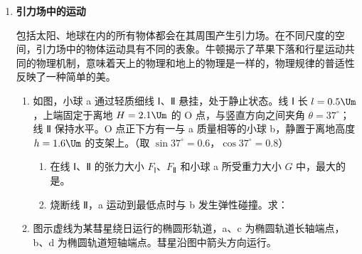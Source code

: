 \documentclass[\gkver]{gaokaozhenti}
\begin{document}
\begin{enumerate}
{（2）加偏振片只会影响激光的强度，并不会影响激光的波长，因此干涉条纹间距不变。正确选项为 B。

（3）与双缝干涉的规律类似，单缝衍射图样中央亮纹的宽度随缝宽的减小而增大、随单缝与传感器距离的增大而增大。正确选项为 AD。

2．由光子能量公式 $E = h\nu$ 和波长、频率、波速关系式 $\nu = \frac{c}{\lambda}$ 可得单个光子的能量为 $\frac{hc}{\lambda}$；由光电方程 $E_{\text{km}} = h\nu - W$ 和逸出功与截止频率关系式 $W = h\nu_{0}$ 可得逸出光电子的最大初动能 $E_{\text{km}} = \frac{hc}{\lambda} - h\nu_{0}$。
}

\item
\textbf{引力场中的运动}

包括太阳、地球在内的所有物体都会在其周围产生引力场。在不同尺度的空间，引力场中的物体运动具有不同的表象。牛顿揭示了苹果下落和行星运动共同的物理机制，意味着天上的物理和地上的物理是一样的，物理规律的普适性反映了一种简单的美。
\begin{enumerate}
	\item
	如图，小球 a 通过轻质细线 Ⅰ、Ⅱ 悬挂，处于静止状态。线 Ⅰ 长 $l = 0.5 \Um$，上端固定于离地 $H = 2.1 \Um$ 的 O 点，与竖直方向之间夹角 $\theta = 37^\circ$；线 Ⅱ 保持水平。O 点正下方有一与 a 质量相等的小球 b，静置于离地高度 $h = 1.6 \Um$ 的支架上。（取 $\sin37^\circ = 0.6$，$\cos37^\circ = 0.8$）

	\onepicture[h=3.2cm, align=right]{}
	\begin{enumerate}
		\item
		在线 Ⅰ、Ⅱ 的张力大小 $F_{\text{Ⅰ}}$、$F_{\text{Ⅱ}}$ 和小球 a 所受重力大小 $G$ 中，最大的是。

		\item
		烧断线 Ⅱ，a 运动到最低点时与 b 发生弹性碰撞。求：
	\end{enumerate}

	\item
	图示虚线为某彗星绕日运行的椭圆形轨道，a、c 为椭圆轨道长轴端点，b、d 为椭圆轨道短轴端点。彗星沿图中箭头方向运行。


\end{enumerate}
\end{enumerate}
\end{document}
